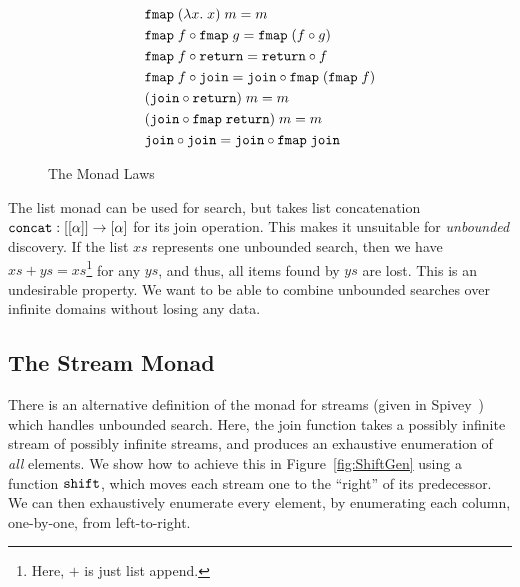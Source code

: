 \begin{figure}
\begin{align}
&\texttt{fmap}\;(\lambda x.\;x)\;m = m\notag\\
&\texttt{fmap}\;f \circ \texttt{fmap}\;g = \texttt{fmap}\;(f \circ g)\notag\\
&\texttt{fmap}\;f \circ \texttt{return} = \texttt{return}\circ f\notag\\
&\texttt{fmap}\;f \circ \texttt{join} = \texttt{join} \circ \texttt{fmap}\;(\texttt{fmap}\;f)\notag\\
&(\texttt{join} \circ \texttt{return})\;m = m\notag\\
&(\texttt{join} \circ \texttt{fmap}\;\texttt{return})\;m = m\notag\\
&\texttt{join} \circ \texttt{join} = \texttt{join} \circ \texttt{fmap}\;\texttt{join} \label{eq:JoinAssoc}
\end{align}
\caption{The Monad Laws}
\label{fig:MonadLaws}
\end{figure}

The list monad can be used for search, but takes list concatenation $\texttt{concat} : [[\alpha]] \rightarrow [\alpha]$ for its join operation. This makes it unsuitable for \emph{unbounded} discovery. If the list $xs$ represents one unbounded search, then we have $xs + ys = xs$\footnote{Here, $+$ is just list append.} for any $ys$, and thus, all items found by $ys$ are lost. This is an undesirable property. We want to be able to combine unbounded searches over infinite domains without losing any data.

\subsection{The Stream Monad}\label{sec:StreamMonad}
There is an alternative definition of the monad for streams (given in Spivey~\cite{SearchAlgebras}) which handles unbounded search. Here, the join function takes a possibly infinite stream of possibly infinite streams, and produces an exhaustive enumeration of \emph{all} elements. We show how to achieve this in Figure~\ref{fig:ShiftGen} using a function $\texttt{shift}$, which moves each stream one to the ``right'' of its predecessor. We can then exhaustively enumerate every element, by enumerating each column, one-by-one, from left-to-right. 


